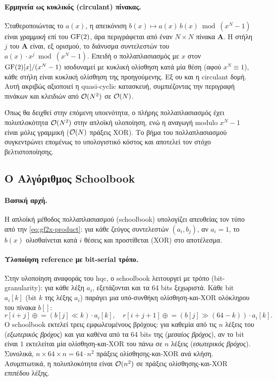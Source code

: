 \paragraph{Ερμηνεία ως κυκλικός (circulant) πίνακας.}
Σταθεροποιώντας το $a(x)$, η απεικόνιση $b(x) \mapsto a(x)\,b(x) \bmod (x^N-1)$
είναι \emph{γραμμική} επί του $\mathrm{GF}(2)$, άρα περιγράφεται από έναν $N \times N$
πίνακα $\mathbf{A}$. Η στήλη $j$ του $\mathbf{A}$ είναι, εξ ορισμού, το διάνυσμα
συντελεστών του $a(x)\cdot x^{j} \bmod (x^N-1)$. Επειδή ο πολλαπλασιασμός με $x$
στον $\mathrm{GF}(2)[x]/(x^{N}-1)$ ισοδυναμεί με κυκλική ολίσθηση κατά μία θέση (αφού
$x^N \equiv 1$), κάθε στήλη είναι κυκλική ολίσθηση της προηγούμενης. Εξ ου και η
circulant δομή. Αυτή ακριβώς αξιοποιεί η quasi-cyclic κατασκευή, συμπιέζοντας
την περιγραφή πινάκων και κλειδιών από $\mathcal{O}(N^2)$ σε $\mathcal{O}(N)$.

Όπως θα δειχθεί στην επόμενη υποενότητα, ο πλήρης πολλαπλασιασμός έχει
πολυπλοκότητα $\mathcal{O}(N^2)$ στην απλοϊκή υλοποίηση, ενώ η αναγωγή modulo $x^N-1$
είναι μόλις γραμμική ($\mathcal{O}(N)$ πράξεις XOR). Το βήμα του πολλαπλασιασμού
συγκεντρώνει επομένως το υπολογιστικό κόστος και αποτελεί τον στόχο
βελτιστοποίησης.


\subsection{Ο Αλγόριθμος Schoolbook}
\label{sec:schoolbook-algorithm}

\paragraph{Βασική αρχή.}
Η απλοϊκή μέθοδος πολλαπλασιασμού (schoolbook) υπολογίζει απευθείας τον τύπο
από την \cref{eq:gf2x-product}: για κάθε ζεύγος συντελεστών $(a_i, b_j)$, αν
$a_i = 1$, το $b(x)$ ολισθαίνεται κατά $i$ θέσεις και προστίθεται (XOR) στο
αποτέλεσμα.

\paragraph{Υλοποίηση reference με bit-serial τρόπο.}
Στην υλοποίηση αναφοράς του \gls{hqc}, ο schoolbook λειτουργεί με
 τρόπο (bit-granularity): για κάθε λέξη $a_i$, εξετάζονται και τα 64 bits
ξεχωριστά.
Κάθε bit $a_i[k]$ (bit $k$ της λέξης $a_i$) παράγει μια υπό-συνθήκη
ολίσθηση-και-XOR ολόκληρου του πίνακα $b[]$:
\begin{equation}
  r[i+j] \mathrel{\oplus}= (b[j] \ll k) \cdot a_i[k], \quad
  r[i+j+1] \mathrel{\oplus}= (b[j] \gg (64-k)) \cdot a_i[k].
\end{equation}
Ο schoolbook εκτελεί τρεις εμφωλευμένους βρόχους: για καθεμία από τις $n$ λέξεις
του  (\emph{εξωτερικός βρόχος}) και για καθένα από τα 64 bits της
(\emph{μεσαίος βρόχος}), αν το bit είναι $1$ εκτελείται μία ολίσθηση-και-XOR του
 πάνω σε $n$ λέξεις (\emph{εσωτερικός βρόχος}). Συνολικά,
$n \times 64 \times n = 64 \cdot n^2$ πράξεις ολίσθησης-και-XOR ανά κλήση.
Ασυμπτωτικά, η πολυπλοκότητα είναι $\mathcal{O}(n^2)$ σε πράξεις ολίσθησης-και-XOR επιπέδου λέξης.


